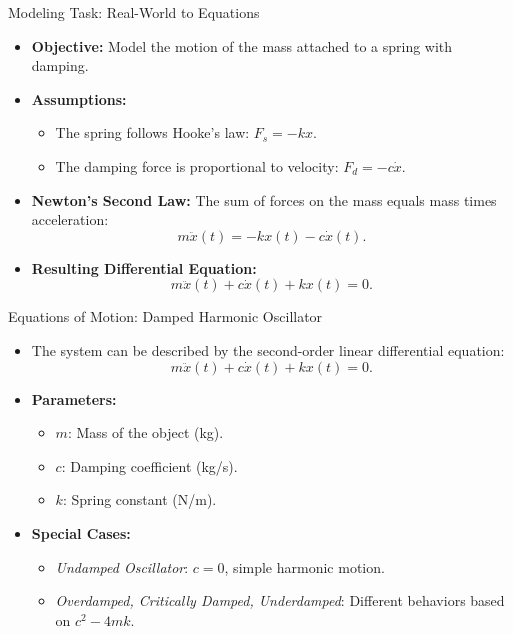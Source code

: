 \documentclass{beamer}
\begin{document}
\begin{frame}{Modeling Task: Real-World to Equations}
    \begin{itemize}
        \item \textbf{Objective:} Model the motion of the mass attached to a spring with damping.
        \item \textbf{Assumptions:}
        \begin{itemize}
            \item The spring follows Hooke's law: $F_s = -kx$.
            \item The damping force is proportional to velocity: $F_d = -c\dot{x}$.
        \end{itemize}
        \item \textbf{Newton's Second Law:} The sum of forces on the mass equals mass times acceleration:
        \[
        m \ddot{x}(t) = -kx(t) - c \dot{x}(t).
        \]
        \item \textbf{Resulting Differential Equation:}
        \[
        m \ddot{x}(t) + c \dot{x}(t) + k x(t) = 0.
        \]
    \end{itemize}
\end{frame}

\begin{frame}{Equations of Motion: Damped Harmonic Oscillator}
    \begin{itemize}
        \item The system can be described by the second-order linear differential equation:
        \[
        m \ddot{x}(t) + c \dot{x}(t) + k x(t) = 0.
        \]
        \item \textbf{Parameters:}
        \begin{itemize}
            \item $m$: Mass of the object (kg).
            \item $c$: Damping coefficient (kg/s).
            \item $k$: Spring constant (N/m).
        \end{itemize}
        \item \textbf{Special Cases:}
        \begin{itemize}
            \item \textit{Undamped Oscillator}: $c = 0$, simple harmonic motion.
            \item \textit{Overdamped, Critically Damped, Underdamped}: Different behaviors based on $c^2 - 4mk$.
        \end{itemize}
    \end{itemize}
\end{frame}
\end{document}
